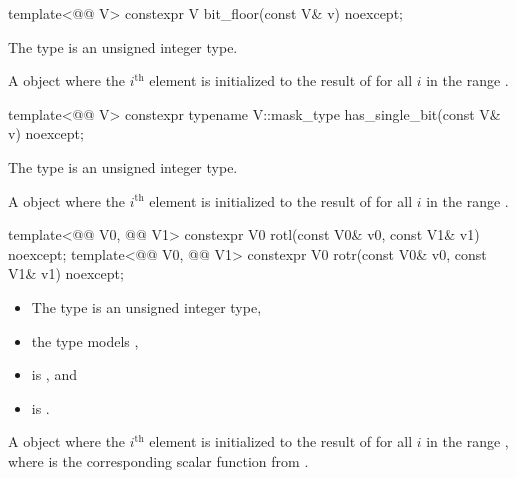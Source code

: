 \begin{itemdecl}
template<@@ V> constexpr V bit_floor(const V& v) noexcept;
\end{itemdecl}

\begin{itemdescr}
\pnum
\constraints
The type  is an unsigned integer type.

\pnum
\returns
A  object where the $i^\text{th}$ element is initialized to
the result of  for all $i$ in the range
.
\end{itemdescr}

\begin{itemdecl}
template<@@ V>
  constexpr typename V::mask_type has_single_bit(const V& v) noexcept;
\end{itemdecl}

\begin{itemdescr}
\pnum
\constraints
The type  is an unsigned integer type.

\pnum
\returns
A  object where the $i^\text{th}$ element is initialized
to the result of  for all $i$ in the range
.
\end{itemdescr}

\begin{itemdecl}
template<@@ V0, @@ V1>
  constexpr V0 rotl(const V0& v0, const V1& v1) noexcept;
template<@@ V0, @@ V1>
  constexpr V0 rotr(const V0& v0, const V1& v1) noexcept;
\end{itemdecl}

\begin{itemdescr}
\pnum
\constraints
\begin{itemize}
 \item
   The type  is an unsigned integer type,
 \item
   the type  models ,
 \item
    is , and
 \item
    is .
\end{itemize}

\pnum
\returns
A  object where the $i^\text{th}$ element is initialized to
the result of  for all $i$ in the range ,
where  is the corresponding scalar function from .
\end{itemdescr}

